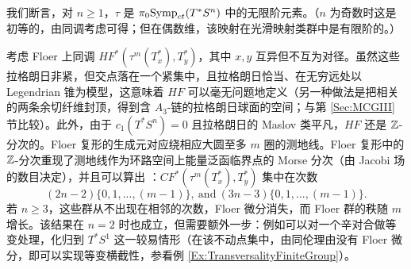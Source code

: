 我们断言，对 $n\geq 1$，$\tau$ 是 $\pi_0\mathrm{Symp}_{ct}(T^*S^n)$ 中的无限阶元素。（$n$ 为奇数时这是初等的，由同调考虑可得；但在偶数维，该映射在光滑映射类群中是有限阶的。）

考虑 Floer 上同调 $HF^*(\tau^m (T_x^*), T_y^*)$，其中 $x, y$ 互异但不互为对径。虽然这些拉格朗日非紧，但交点落在一个紧集中，且拉格朗日恰当、在无穷远处以 Legendrian 锥为模型，这意味着 $HF$ 可以毫无问题地定义（另一种做法是把相关的两条余切纤维封顶，得到含 $A_3$-链的拉格朗日球面的空间；与第 \ref{Sec:MCGIII} 节比较）。此外，由于 $c_1(T^*S^n) = 0$ 且拉格朗日的 Maslov 类平凡，$HF$ 还是 $\mathbb{Z}$-分次的。Floer 复形的生成元对应绕相应大圆至多 $m$ 圈的测地线。Floer 复形中的 $\mathbb{Z}$-分次重现了测地线作为环路空间上能量泛函临界点的 Morse 分次（由 Jacobi 场的数目决定），并且可以算出 \cite{FrauSchlenk}：$CF^*(\tau^m (T_x^*), T_y^*)$ 集中在次数
\[
(2n-2) \{0,1,...,(m-1)\}, \ \mathrm{and} \ (3n-3)\{0,1,...,(m-1)\}.
\]
若 $n \geq 3$，这些群从不出现在相邻的次数，Floer 微分消失，而 Floer 群的秩随 $m$ 增长。该结果在 $n=2$ 时也成立，但需要额外一步：例如可以对一个辛对合做等变处理，化归到 $T^*S^1$ 这一较易情形（在该不动点集中，由同伦理由没有 Floer 微分，即可以实现等变横截性，参看例 \ref{Ex:TransversalityFiniteGroup}）。

